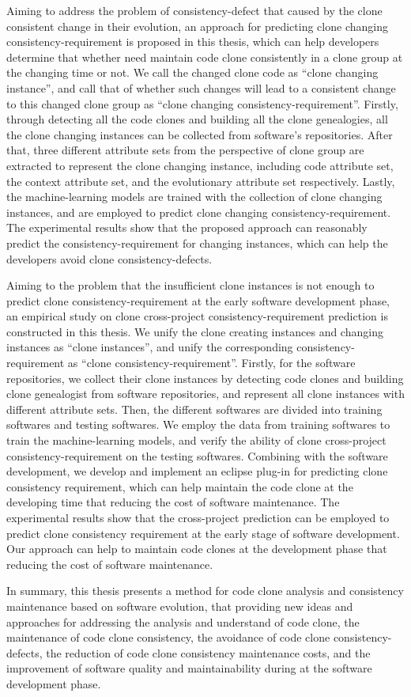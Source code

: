 {Aiming to address the problem of consistency-defect that caused by the clone consistent change in their evolution, an approach for predicting clone changing consistency-requirement is proposed in this thesis, which can help developers determine that whether need maintain code clone consistently in a clone group at the changing time or not. 
We call the changed clone code as ``clone changing instance'', and call that of whether such changes will lead to a consistent change to this changed clone group as ``clone changing consistency-requirement''.
Firstly, through detecting all the code clones and building all the clone genealogies, all the clone changing instances can be collected from software's repositories.
After that, three different attribute sets from the perspective of clone group are extracted to represent the clone changing instance, including code attribute set, the context attribute set, and the evolutionary attribute set respectively.
Lastly, the machine-learning models are trained with the collection of clone changing instances, and are employed to predict clone changing consistency-requirement.
The experimental results show that the proposed approach can reasonably predict the consistency-requirement for changing instances, which can help the developers avoid clone consistency-defects.

Aiming to the problem that the insufficient clone instances is not enough to predict clone consistency-requirement at the early software development phase, an empirical study on clone cross-project consistency-requirement prediction is constructed in this thesis.
We unify the clone creating instances and changing instances as ``clone instances'', and unify the corresponding consistency-requirement as ``clone consistency-requirement''.
Firstly, for the software repositories, we collect their clone instances by detecting code clones and building clone genealogist from software repositories, and represent all clone instances with different attribute sets.
Then, the different softwares are divided into training softwares and testing softwares.
We employ the data from training softwares to train the machine-learning models, and verify the ability of clone cross-project consistency-requirement on the testing softwares.
Combining with the software development, we develop and implement an eclipse plug-in for predicting clone consistency requirement, which can help maintain the code clone at the developing time that reducing the cost of software maintenance.
The experimental results show that the cross-project prediction can be employed to predict clone consistency requirement at the early stage of software development.
Our approach can help to maintain code clones at the development phase that reducing the cost of software maintenance.

In summary, this thesis presents a method for code clone analysis and consistency maintenance based on software evolution, that providing new ideas and approaches for addressing the analysis and understand of code clone, the maintenance of code clone consistency, the avoidance of code clone consistency-defects, the reduction of code clone consistency maintenance costs, and the improvement of software quality and maintainability during at the software development phase.
}

\makecover
\clearpage 
